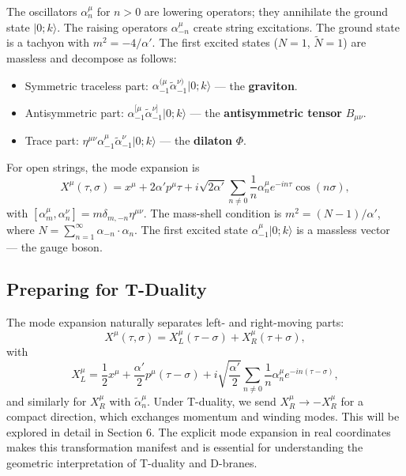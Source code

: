 \documentclass[11pt]{article}
\renewcommand{\tilde}{\widetilde}
\begin{document}
The oscillators $\alpha_n^\mu$ for $n>0$ are lowering operators; they annihilate the ground state $|0;k\rangle$. The raising operators $\alpha_{-n}^\mu$ create string excitations. The ground state is a tachyon with $m^2 = -4/\alpha'$. The first excited states ($N=1$, $\tilde{N}=1$) are massless and decompose as follows:
\begin{itemize}
\item Symmetric traceless part: $\alpha_{-1}^{(\mu} \tilde{\alpha}_{-1}^{\nu)} |0;k\rangle$ — the \textbf{graviton}.
\item Antisymmetric part: $\alpha_{-1}^{[\mu} \tilde{\alpha}_{-1}^{\nu]} |0;k\rangle$ — the \textbf{antisymmetric tensor} $B_{\mu\nu}$.
\item Trace part: $\eta^{\mu\nu} \alpha_{-1}^\mu \tilde{\alpha}_{-1}^\nu |0;k\rangle$ — the \textbf{dilaton} $\Phi$.
\end{itemize}
For open strings, the mode expansion is
\begin{equation}
X^\mu(\tau,\sigma) = x^\mu + 2\alpha' p^\mu \tau + i \sqrt{2\alpha'} \sum_{n\neq 0} \frac{1}{n} \alpha_n^\mu e^{-in\tau} \cos(n\sigma),
\end{equation}
with $[\alpha_m^\mu, \alpha_n^\nu] = m \delta_{m,-n} \eta^{\mu\nu}$. The mass-shell condition is $m^2 = (N-1)/\alpha'$, where $N = \sum_{n=1}^\infty \alpha_{-n} \cdot \alpha_n$. The first excited state $\alpha_{-1}^\mu |0;k\rangle$ is a massless vector — the gauge boson.

\subsection{Preparing for T-Duality}

The mode expansion naturally separates left- and right-moving parts:
\begin{equation}
X^\mu(\tau,\sigma) = X_L^\mu(\tau-\sigma) + X_R^\mu(\tau+\sigma),
\end{equation}
with
\begin{equation}
X_L^\mu = \frac{1}{2}x^\mu + \frac{\alpha'}{2} p^\mu (\tau-\sigma) + i \sqrt{\frac{\alpha'}{2}} \sum_{n\neq 0} \frac{1}{n} \alpha_n^\mu e^{-in(\tau-\sigma)},
\end{equation}
and similarly for $X_R^\mu$ with $\tilde{\alpha}_n^\mu$. Under T-duality, we send $X_R^\mu \to -X_R^\mu$ for a compact direction, which exchanges momentum and winding modes. This will be explored in detail in Section 6. The explicit mode expansion in real coordinates makes this transformation manifest and is essential for understanding the geometric interpretation of T-duality and D-branes.
\end{document}
